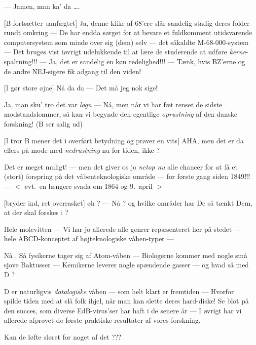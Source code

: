 \documentclass[a4paper,11pt]{article}
\begin{document}
\begin{sketch}
  
   ---            Jamen, man ka' da \dots.


  


  [B fortsætter uanfægtet] Ja, denne klike af 68'ere slår
  sandelig stadig deres folder rundt omkring --- De har endda sørget
  for at bevare et fuldkomment utidsvarende computersystem som minde
  over sig (dem) selv --- det såkaldte M-68-000-system --- Det bruges
  vist iøvrigt udelukkende til at lære de studerende at udføre {\em
    kerne}-spaltning!!! --- Ja, det er sandelig en køn redelighed!!!
  --- Tænk, hvis BZ'erne og de andre NEJ-sigere fik adgang til den
  viden!

  
  [I gør store øjne] Nå da da --- Det må jeg nok sige!

   Ja, man sku' tro det var {\em løgn} --- Nå, men når vi har
  fæt renset de sidste modstandslommer, så kan vi begynde den
  egentlige {\em oprustning}\/ af den danske forskning!  (B ser salig
  ud)
  
  [I tror B mener det i overført betydning og prøver en
    vits] AHA, men det er da el\-lers på mode med {\em nedrustning}\/
  nu for tiden, ikke ?

   Det er meget muligt! --- men det giver os jo {\em netop
    nu}\/ alle chancer for at få et (stort) forspring på det
  våbenteknologiske område --- for første gang siden 1849!!! --- $<$
  evt.\ en længere svada om 1864 og 9.\ april $>$

  
  [bryder ind, ret overrasket] øh ? --- Nå ? og hvilke
  områder har De så tænkt Dem, at der skal forskes i ?

  
          Hele molevitten --- Vi har jo allerede alle genrer 
  repæsenteret her på stedet --- hele ABCD-konceptet
  af højteknologiske våben-typer --- 

       Nå , Så fysikerne tager sig af Atom-våben ---
  Biologerne kommer med nogle små sjove Baktusser ---
  Kemikerne leverer nogle spændende gasser --- og hvad
  så med D ?

          D er naturligvis {\em datalogiske}\/ våben --- som helt klart
  er fremtiden --- Hvorfor spilde tiden med at slå folk
  ihjel, når man kan slette deres hard-diske! Se blot på
  den succes, som diverse EdB-virus'ser har haft i de 
  senere år  ---   I øvrigt har vi allerede afprøvet de 
  første praktiske resultater af vores forskning.

          Kan de løfte sløret for noget af det ???


\end{sketch}
\end{document}
